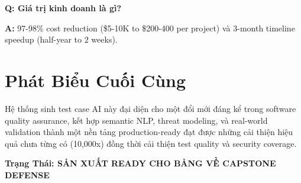 \documentclass[12pt,oneside]{report}
\begin{document}
\textbf{Q: Giá trị kinh doanh là gì?}

\textbf{A:} 97-98\% cost reduction (\$5-10K to \$200-400 per project) và 3-month 
timeline speedup (half-year to 2 weeks).

\section{Phát Biểu Cuối Cùng}

Hệ thống sinh test case AI này đại diện cho một đổi mới đáng kể trong software 
quality assurance, kết hợp semantic NLP, threat modeling, và real-world validation 
thành một nền tảng production-ready đạt được những cải thiện hiệu quả chưa từng có 
(10,000x) đồng thời cải thiện test quality và security coverage.

\textbf{Trạng Thái: SẢN XUẤT READY CHO BẢNG VỀ CAPSTONE DEFENSE}
\end{document}
